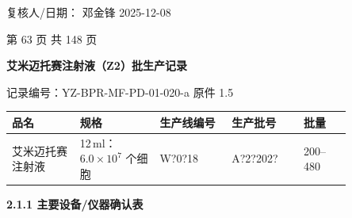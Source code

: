 \documentclass[UTF8,10pt,a4paper,fontset=fandol]{ctexart}
\newcommand{\fieldvalue}[1]{#1}
\newcommand{\handwritten}[1]{#1}
\begin{document}
\hfill
复核人/日期：
\fieldvalue{\handwritten{邓金锋}}
\quad
\fieldvalue{\handwritten{2025-12-08}}

\begin{center}
第 63 页 共 148 页
\end{center}

\newpage

\begin{center}
\textbf{艾米迈托赛注射液（Z2）批生产记录}
\end{center}

\noindent
记录编号：YZ-BPR-MF-PD-01-020-a \hfill
\fieldvalue{原件}
\hfill
\fieldvalue{1.5}

\begin{tabular}{|p{0.17\linewidth}|p{0.20\linewidth}|p{0.18\linewidth}|p{0.18\linewidth}|p{0.12\linewidth}|}
\hline
品名 & 规格 & 生产线编号 & 生产批号 & 批量\\
\hline
艾米迈托赛注射液 &
12\,ml：$6.0\times10^{7}$ 个细胞 &
\fieldvalue{\handwritten{W?0?18}} &
\fieldvalue{\handwritten{A?2?202?}} &
200--480
\\
\hline
\end{tabular}

\medskip
\textbf{2.1.1 主要设备/仪器确认表}
\end{document}
